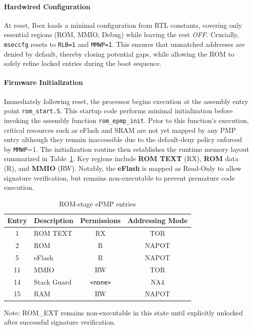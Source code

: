\documentclass[10pt,a4paper,twocolumn,twoside]{article}
\begin{document}
\paragraph{Hardwired Configuration}
At reset, Ibex loads a minimal configuration from RTL constants, covering only essential regions (ROM, MMIO, Debug) while leaving the rest \textit{OFF}. Crucially, \texttt{mseccfg} resets to \texttt{RLB=1} and \texttt{MMWP=1}. This ensures that unmatched addresses are denied by default, thereby closing potential gaps, while allowing the ROM to safely refine locked entries during the boot sequence.

\paragraph{Firmware Initialization}
Immediately following reset, the processor begins execution at the assembly entry point \texttt{rom\_start.S}. This startup code performs minimal initialization before invoking the assembly function \texttt{rom\_epmp\_init}. Prior to this function's execution, critical resources such as eFlash and SRAM are not yet mapped by any PMP entry although they remain inaccessible due to the default-deny policy enforced by \texttt{MMWP}=1. The initialization routine then establishes the runtime memory layout summarized in Table~\ref{tab:epmp-rom}. Key regions include \textbf{ROM TEXT} (RX), \textbf{ROM} data (R), and \textbf{MMIO} (RW). Notably, the \textbf{eFlash} is mapped as Read-Only to allow signature verification, but remains non-executable to prevent premature code execution.

\begin{table}[!t]
\centering
\begin{threeparttable}
\caption{ROM-stage ePMP entries}
\label{tab:epmp-rom}
\small
\setlength{\tabcolsep}{6pt}
\renewcommand{\arraystretch}{1.2}
\begin{tabularx}{\linewidth}{@{}c l c c@{}}
\toprule
\textbf{Entry} & \textbf{Description} & \textbf{Permissions} & \textbf{Addressing Mode} \\
\midrule
1  & ROM TEXT                      & RX    & TOR   \\
2  & ROM                           & R     & NAPOT \\
5  & eFlash                        & R     & NAPOT \\
11 & MMIO & RW    & TOR   \\
14 & Stack Guard         & \texttt{\textless none\textgreater} & NA4 \\
15 & RAM                           & RW    & NAPOT \\
\bottomrule
\end{tabularx}
\begin{tablenotes}\footnotesize
\item Note: ROM\_EXT remains non-executable in this state until explicitly unlocked after successful signature verification.
\end{tablenotes}
\end{threeparttable}
\end{table}
\end{document}
